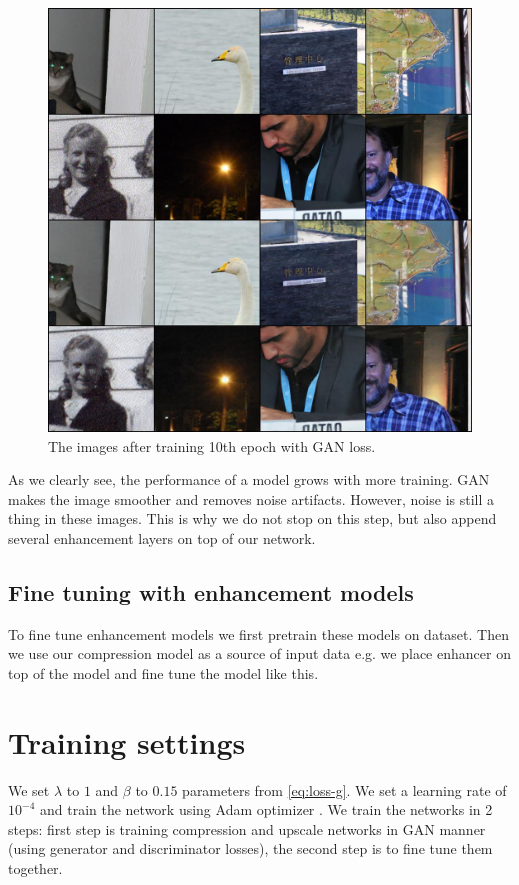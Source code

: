 \begin{figure}
    \centering
    \includegraphics[width=\textwidth]{figure/gan_14000.jpg}
    \caption{The images after training 10th epoch with GAN loss.}
    \label{gan-tenth-epoch}
\end{figure}

As we clearly see, the performance of a model grows with more training. GAN makes the image smoother and removes noise artifacts. However, noise is still a thing in these images. This is why we do not stop on this step, but also append several enhancement layers on top of our network.

\subsection{Fine tuning with enhancement models}

To fine tune enhancement models we first pretrain these models on dataset. Then we use our compression model as a source of input data e.g. we place enhancer on top of the model and fine tune the model like this.

\section{Training settings}

We set $\lambda$ to $1$ and $\beta$ to $0.15$ parameters from \ref{eq:loss-g}. We set a learning rate of $10^{-4}$ and train the network using Adam optimizer \cite{kingma_adam_2017}. We train the networks in 2 steps: first step is training compression and upscale networks in GAN manner (using generator and discriminator losses), the second step is to fine tune them together.

